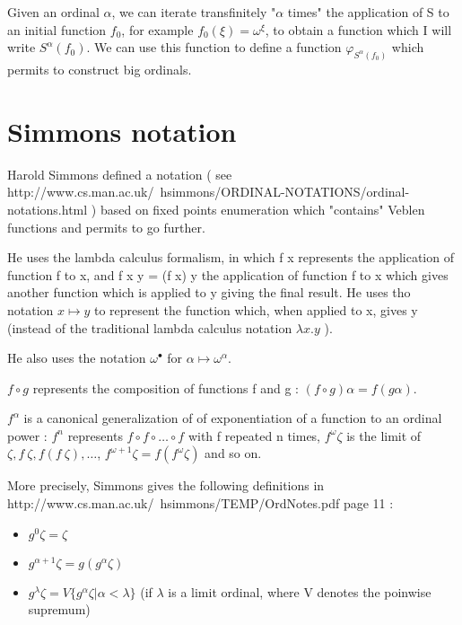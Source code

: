 \documentclass[10pt]{article}
\begin{document}
Given an ordinal \( \alpha \), we can iterate transfinitely "\( \alpha \) times" the application of S to an initial function \( f_0 \), for example \( f_0(\xi) = \omega^\xi \), to obtain a function which I will write \( S^\alpha(f_0) \). We can use this function to define a function \( \varphi_{S^\alpha(f_0)} \) which permits to construct big ordinals.




\section{Simmons notation}

Harold Simmons defined a notation ( see http://www.cs.man.ac.uk/~hsimmons/ORDINAL-NOTATIONS/ordinal-notations.html ) based on fixed points enumeration which "contains" Veblen functions and permits to go further. 

He uses the lambda calculus formalism, in which f x represents the application of function f to x, and f x y = (f x) y the application of function f to x which gives another function which is applied to y giving the final result. 
He uses tho notation \( x \mapsto y \) to represent the function which, when applied to x, gives y (instead of the traditional lambda calculus notation \( \lambda x . y \) ).

He also uses the notation \( \omega^\bullet \) for \( \alpha \mapsto \omega^\alpha \).

\( f \circ g \) represents the composition of functions f and g : \( (f \circ g) \alpha = f(g \alpha) \).

\( f^\alpha \) is a canonical generalization of of exponentiation of a function to an ordinal power : \( f^n \) represents \( f \circ f \circ \ldots \circ f \) with f repeated n times, \( f^\omega \zeta \) is the limit of \( \zeta, f\ \zeta, f(f\ \zeta), \ldots \), \( f^{\omega+1} \zeta = f(f^\omega \zeta) \) and so on.

\bigskip

More precisely, Simmons gives the following definitions in http://www.cs.man.ac.uk/~hsimmons/TEMP/OrdNotes.pdf page 11 : 

\begin{itemize}
     \setlength{\itemsep}{1pt}
     \setlength{\parskip}{0pt}
     \setlength{\parsep}{0pt}
\item \( g^0 \zeta = \zeta \)
\item \( g^{\alpha+1} \zeta = g (g^\alpha \zeta) \)
\item \( g^\lambda \zeta = V \lbrace g^\alpha \zeta | \alpha < \lambda \rbrace \) (if \( \lambda \) is a limit ordinal, where V denotes the poinwise supremum)
\end{itemize}
\end{document}
